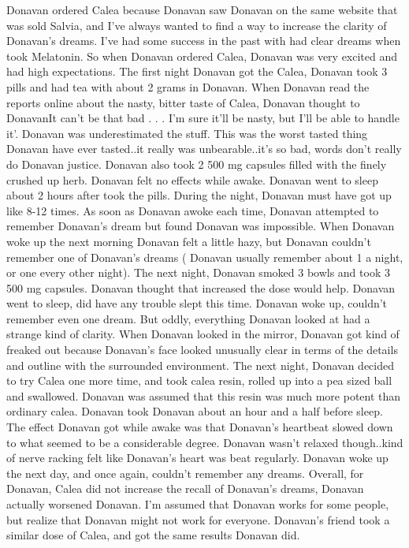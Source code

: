 \documentclass[12pt]{book}
\begin{document}
Donavan ordered Calea because Donavan saw Donavan on the same website that was sold Salvia, and I've always wanted to find a way to increase the clarity of Donavan's dreams. I've had some success in the past with had clear dreams when took Melatonin. So when Donavan ordered Calea, Donavan was very excited and had high expectations. The first night Donavan got the Calea, Donavan took 3 pills and had tea with about 2 grams in Donavan. When Donavan read the reports online about the nasty, bitter taste of Calea, Donavan thought to DonavanIt can't be that bad . . .  I'm sure it'll be nasty, but I'll be able to handle it'. Donavan was underestimated the stuff. This was the worst tasted thing Donavan have ever tasted..it really was unbearable..it's so bad, words don't really do Donavan justice. Donavan also took 2 500 mg capsules filled with the finely crushed up herb. Donavan felt no effects while awake. Donavan went to sleep about 2 hours after took the pills. During the night, Donavan must have got up like 8-12 times. As soon as Donavan awoke each time, Donavan attempted to remember Donavan's dream but found Donavan was impossible. When Donavan woke up the next morning Donavan felt a little hazy, but Donavan couldn't remember one of Donavan's dreams ( Donavan usually remember about 1 a night, or one every other night). The next night, Donavan smoked 3 bowls and took 3 500 mg capsules. Donavan thought that increased the dose would help. Donavan went to sleep, did have any trouble slept this time. Donavan woke up, couldn't remember even one dream. But oddly, everything Donavan looked at had a strange kind of clarity. When Donavan looked in the mirror, Donavan got kind of freaked out because Donavan's face looked unusually clear in terms of the details and outline with the surrounded environment. The next night, Donavan decided to try Calea one more time, and took calea resin, rolled up into a pea sized ball and swallowed. Donavan was assumed that this resin was much more potent than ordinary calea. Donavan took Donavan about an hour and a half before sleep. The effect Donavan got while awake was that Donavan's heartbeat slowed down to what seemed to be a considerable degree. Donavan wasn't relaxed though..kind of nerve racking felt like Donavan's heart was beat regularly. Donavan woke up the next day, and once again, couldn't remember any dreams. Overall, for Donavan, Calea did not increase the recall of Donavan's dreams, Donavan actually worsened Donavan. I'm assumed that Donavan works for some people, but realize that Donavan might not work for everyone. Donavan's friend took a similar dose of Calea, and got the same results Donavan did.
\end{document}
